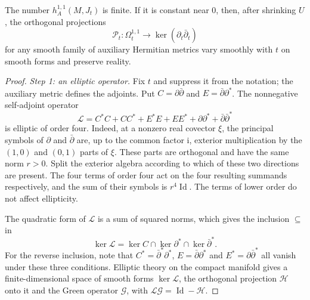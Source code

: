 \begin{lemma}\label{lem:aeppli-smooth-projection}
The number $h_A^{1,1}(M,J_t)$ is finite. If it is constant near $0$, then, after shrinking $U$, the orthogonal projections
\[
 \mathcal P_t\colon\Omega_t^{1,1}\longrightarrow\ker(\partial_t\bar\partial_t)
\]
for any smooth family of auxiliary Hermitian metrics vary smoothly with $t$ on smooth forms and preserve reality.
\end{lemma}
\begin{proof}
\emph{Step 1: an elliptic operator.} Fix $t$ and suppress it from the notation; the auxiliary metric defines the adjoints. Put $C=\partial\bar\partial$ and $E=\bar\partial\partial^*$. The nonnegative self-adjoint operator
\begin{equation}\label{eq:aeppli-elliptic-operator}
 \mathcal L=C^*C+CC^*+E^*E+EE^*
                  +\partial\partial^*+\bar\partial\bar\partial^*
\end{equation}
is elliptic of order four. Indeed, at a nonzero real covector $\xi$, the principal symbols of $\partial$ and $\bar\partial$ are, up to the common factor $\mathrm i$, exterior multiplication by the $(1,0)$ and $(0,1)$ parts of $\xi$. These parts are orthogonal and have the same norm $r>0$. Split the exterior algebra according to which of these two directions are present. The four terms of order four act on the four resulting summands respectively, and the sum of their symbols is $r^4\operatorname{Id}$. The terms of lower order do not affect ellipticity.

The quadratic form of $\mathcal L$ is a sum of squared norms, which gives the inclusion $\subseteq$ in
\[
 \ker\mathcal L=\ker C\cap\ker\partial^*\cap\ker\bar\partial^*.
\]
For the reverse inclusion, note that $C^*=\bar\partial^*\partial^*$, $E=\bar\partial\partial^*$ and $E^*=\partial\bar\partial^*$ all vanish under these three conditions. Elliptic theory on the compact manifold gives a finite-dimensional space of smooth forms $\ker\mathcal L$, the orthogonal projection $\mathcal H$ onto it and the Green operator $\mathcal G$, with $\mathcal L\mathcal G=\operatorname{Id}-\mathcal H$.


\end{proof}
